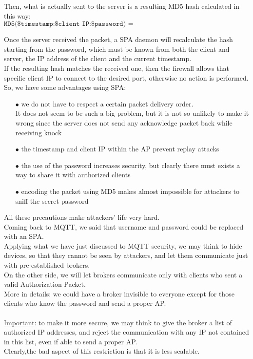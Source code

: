 \documentclass[12pt]{report}
\begin{document}
{Then, what is actually sent to the server is a resulting MD5 hash calculated in this way:
$$ \texttt{MD5(\$timestamp:\$client IP:\$password) = 35b45e73c99905b675ffb05b78714eb9} $$

Once the server received the packet, a SPA daemon will recalculate the hash starting from the password, which must be known from both the client and server, the IP address of the client and the current timestamp.\\
If the resulting hash matches the received one, then the firewall allows that specific client IP to connect to the desired port, otherwise no action is performed.\\
So, we have some advantages using SPA:

\begin{itemize}
\setlength{\itemindent}{+4mm}
\item[$\bullet$] we do not have to respect a certain packet delivery order.\\
It does not seem to be such a big problem, but it is not so unlikely to make it wrong since the server does not send any acknowledge packet back while receiving knock
\item[$\bullet$] the timestamp and client IP within the AP prevent replay attacks
\item[$\bullet$] the use of the password increases security, but clearly there must exists a way to share it with authorized clients
\item[$\bullet$] encoding the packet using MD5 makes almost impossible for attackers to sniff the secret password
\end{itemize}

All these precautions make attackers' life very hard.\\

Coming back to MQTT, we said that username and password could be replaced with an SPA.\\
Applying what we have just discussed to MQTT security, we may think to hide devices, so that they cannot be seen by attackers, and let them communicate just with pre-established brokers.\\
On the other side, we will let brokers communicate only with clients who sent a valid Authorization Packet.\\
More in details: we could have a broker invisible to everyone except for those clients who know the password and send a proper AP.\\\\
\underline{Important}: to make it more secure, we may think to give the broker a list of authorized IP addresses, and reject the communication with any IP not contained in this list, even if able to send a proper AP.\\
Clearly,the bad aspect of this restriction is that it is less scalable.\\

}
\end{document}
